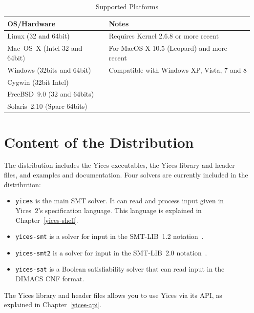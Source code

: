 \documentclass[11pt,twoside,fleqn,openright,titlepage]{cslreport}
\begin{document}
\begin{table}
\begin{center}
\renewcommand{\arraystretch}{1.1}
\begin{tabular}{|l|l|}
\hline
\textbf{OS/Hardware} & \textbf{Notes} \\
\hline
\hline
Linux (32 and 64bit)    & Requires Kernel 2.6.8 or more recent \\
\hline
Mac~OS~X (Intel 32 and 64bit) & For MacOS X 10.5 (Leopard) and more recent \\
\hline
Windows (32bits and 64bit) & Compatible with Windows XP, Vista, 7 and 8\\
\hline
Cygwin (32bit Intel)  &  \\
\hline
FreeBSD~9.0 (32 and 64bits) &  \\
\hline
Solaris~2.10 (Sparc 64bits)  & \\
\hline
\end{tabular}
\end{center}
\caption{Supported Platforms}
\label{versions}
\end{table}


\section{Content of  the Distribution}

The distribution includes the Yices executables, the Yices library and
header files, and examples and documentation.  Four solvers are currently included in the
distribution:
\begin{itemize}
\item \texttt{yices} is  the main SMT solver. It  can read and process
  input given  in Yices~2's  specification language. This  language is
  explained in Chapter~\ref{yices-shell}.

\item  \texttt{yices-smt} is  a solver  for input  in  the SMT-LIB~1.2
  notation~\cite{SMTLIB12:2006}.

\item \texttt{yices-smt2} is a solver for input in the SMT-LIB~2.0
  notation~\cite{SMTLIB20:2012}.

\item \texttt{yices-sat}  is a Boolean satisfiability  solver that can
  read input in the DIMACS CNF format.
\end{itemize}
 The Yices library and header files allows you to use Yices via its
 API, as explained in Chapter~\ref{yices-api}.
\end{document}
